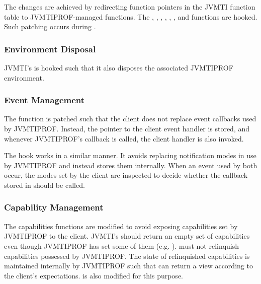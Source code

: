The changes are achieved by redirecting function pointers in the JVMTI function table to JVMTIPROF-managed functions. The , , , , , ,  and  functions are hooked. Such patching occurs during .

\subsubsection*{Environment Disposal}

JVMTI's  is hooked such that it also disposes the associated JVMTIPROF environment.

\subsubsection*{Event Management}

The  function is patched such that the client does not replace event callbacks used by JVMTIPROF. Instead, the pointer to the client event handler is stored, and whenever JVMTIPROF's callback is called, the client handler is also invoked.

The  hook works in a similar manner. It avoids replacing notification modes in use by JVMTIPROF and instead stores them internally. When an event used by both occur, the modes set by the client are inspected to decide whether the callback stored in  should be called.

\subsubsection*{Capability Management}

The capabilities functions are modified to avoid exposing capabilities set by JVMTIPROF to the client. JVMTI's  should return an empty set of capabilities even though JVMTIPROF has set some of them (e.g. ).  must not relinquish capabilities possessed by JVMTIPROF. The state of relinquished capabilities is maintained internally by JVMTIPROF such that  can return a view according to the client's expectations.  is also modified for this purpose.

